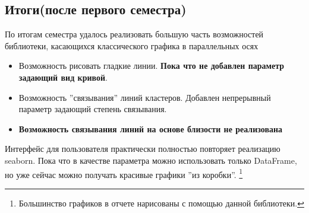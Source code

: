 \documentclass[12pt,fleqn]{article}
\begin{document}
\subsection{Итоги(после первого семестра)}
По итогам семестра удалось реализовать большую часть возможностей библиотеки, касающихся классического
графика в параллельных осях
\begin{itemize}
    \item Возможность рисовать гладкие линии. \textbf{Пока что не добавлен параметр задающий вид кривой}.
    \item Возможность ''связывания'' линий кластеров. 
    Добавлен непрерывный параметр задающий степень связывания.
    \item \textbf{Возможность связывания линий на основе близости не реализована}
\end{itemize}

Интерфейс для пользователя практически полностью повторяет реализацию seaborn. Пока что в качестве 
параметра можно использовать только DataFrame, но уже сейчас можно получать красивые графики ''из коробки''.
\footnote{Большинство графиков в отчете нарисованы с помощью данной библиотеки.}
\end{document}
